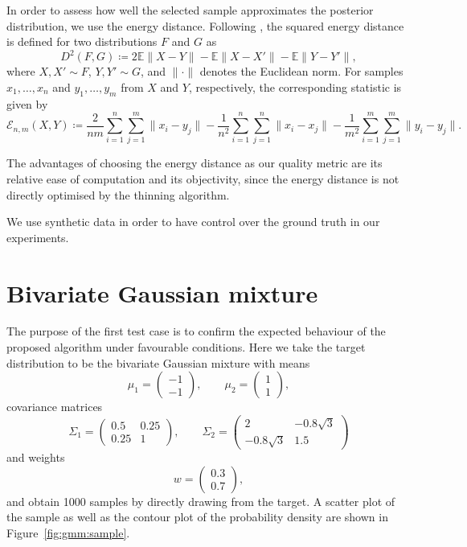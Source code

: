 \documentclass[11pt,a4paper]{report}
\begin{document}
In order to assess how well the selected sample approximates the posterior distribution, we use the energy distance. Following \cite{rizzoEnergyDistance2016}, the squared energy distance is defined for two distributions $F$ and $G$ as
$$D^2(F, G) \coloneq 2 \mathbb{E} \|X - Y\| - \mathbb{E}\|X - X'\| - \mathbb{E} \|Y - Y'\|,$$
where $X, X' \sim F$, $Y, Y' \sim G$, and $\|\cdot\|$ denotes the Euclidean norm. For samples $x_1, \dots, x_n$ and $y_1, \dots, y_m$ from $X$ and $Y$, respectively, the corresponding statistic is given by
\begin{equation*}
\mathcal{E}_{n,m}(X, Y) \coloneq \frac{2}{nm}\sum_{i=1}^n \sum_{j=1}^m \|x_i - y_j\| - \frac{1}{n^2} \sum_{i=1}^n\sum_{j=1}^n \|x_i - x_j\| - \frac{1}{m^2} \sum_{i=1}^m \sum_{j=1}^m \|y_i - y_j\|.
\label{eq:energy-distance:discrete}
\end{equation*}

The advantages of choosing the energy distance as our quality metric are its relative ease of computation and its objectivity, since the energy distance is not directly optimised by the thinning algorithm.

We use synthetic data in order to have control over the ground truth in our experiments.

\section{Bivariate Gaussian mixture}
\label{sec:gaussian-mixture}

The purpose of the first test case is to confirm the expected behaviour of the proposed algorithm under favourable conditions. Here we take the target distribution to be the bivariate Gaussian mixture with means 
$$
\mu_1 = \begin{pmatrix} -1 \\ -1 \end{pmatrix}, \qquad
\mu_2 = \begin{pmatrix} 1 \\ 1 \end{pmatrix},
$$
covariance matrices
$$
\Sigma_1 = \begin{pmatrix}
0.5 & 0.25\\
0.25 & 1
\end{pmatrix}, \qquad
\Sigma_2 = \begin{pmatrix}
2 & -0.8 \sqrt{3}\\
-0.8 \sqrt{3} & 1.5
\end{pmatrix}
$$
and weights
$$w = \begin{pmatrix} 0.3 \\ 0.7 \end{pmatrix},$$
and obtain 1000 samples by directly drawing from the target. A scatter plot of the sample as well as the contour plot of the probability density are shown in Figure~\ref{fig:gmm:sample}.
\end{document}

